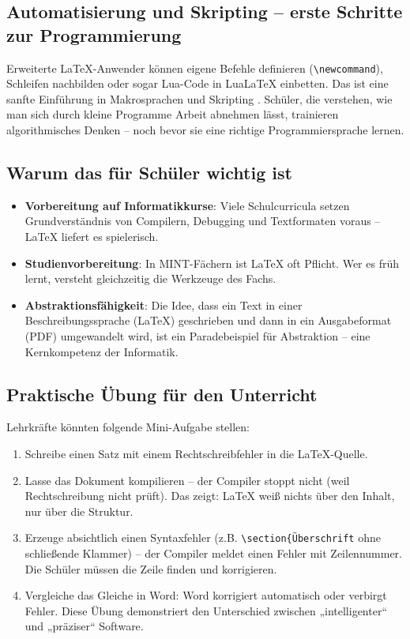 \documentclass[a4paper,12pt]{article}
\begin{document}
	\subsection{Automatisierung und Skripting – erste Schritte zur Programmierung}
	Erweiterte LaTeX-Anwender können eigene Befehle definieren (\verb|\newcommand|), Schleifen nachbilden oder sogar Lua-Code in LuaLaTeX einbetten. Das ist eine sanfte Einführung in Makrosprachen und Skripting \cite{latex-macros}. Schüler, die verstehen, wie man sich durch kleine Programme Arbeit abnehmen lässt, trainieren algorithmisches Denken – noch bevor sie eine richtige Programmiersprache lernen.
	
	\subsection{Warum das für Schüler wichtig ist}
	\begin{itemize}
		\item \textbf{Vorbereitung auf Informatikkurse}: Viele Schulcurricula setzen Grundverständnis von Compilern, Debugging und Textformaten voraus – LaTeX liefert es spielerisch.
		\item \textbf{Studienvorbereitung}: In MINT-Fächern ist LaTeX oft Pflicht. Wer es früh lernt, versteht gleichzeitig die Werkzeuge des Fachs.
		\item \textbf{Abstraktionsfähigkeit}: Die Idee, dass ein Text in einer Beschreibungssprache (LaTeX) geschrieben und dann in ein Ausgabeformat (PDF) umgewandelt wird, ist ein Paradebeispiel für Abstraktion – eine Kernkompetenz der Informatik.
	\end{itemize}
	
	\subsection{Praktische Übung für den Unterricht}
	Lehrkräfte könnten folgende Mini-Aufgabe stellen:
	\begin{enumerate}
		\item Schreibe einen Satz mit einem Rechtschreibfehler in die LaTeX-Quelle.
		\item Lasse das Dokument kompilieren – der Compiler stoppt nicht (weil Rechtschreibung nicht prüft). Das zeigt: LaTeX weiß nichts über den Inhalt, nur über die Struktur.
		\item Erzeuge absichtlich einen Syntaxfehler (z.B. \verb|\section{Überschrift| ohne schließende Klammer) – der Compiler meldet einen Fehler mit Zeilennummer. Die Schüler müssen die Zeile finden und korrigieren.
			\item Vergleiche das Gleiche in Word: Word korrigiert automatisch oder verbirgt Fehler. Diese Übung demonstriert den Unterschied zwischen „intelligenter“ und „präziser“ Software.
		\end{enumerate}
		
\end{document}
